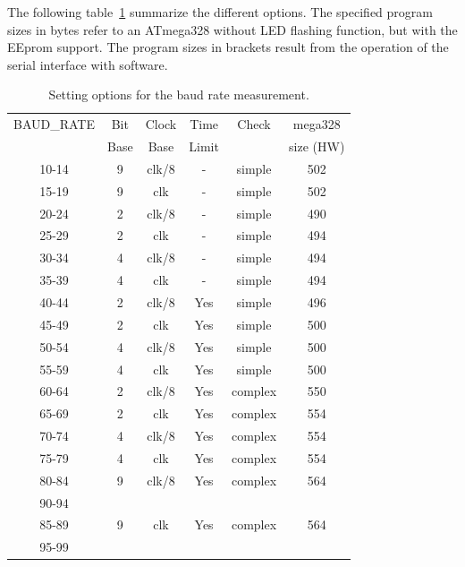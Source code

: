 The following table~\ref{tab:AutoBaudControl} summarize the different options.
The specified program sizes in bytes refer to an ATmega328 without LED flashing function,
but with the EEprom support.
The program sizes in brackets result from the operation of the serial interface with software.

\begin{table}[H]
  \begin{center}
    \begin{tabular}{| c | c | c | c | c | c |}
    \hline
    BAUD\_RATE  & Bit   & Clock  & Time  & Check & mega328\\
		& Base  & Base   & Limit &       & size (HW) \\
    \hline
    \hline
	    10-14      &  9     & clk/8 &   -    & simple  & 502  \\
    \hline
	    15-19      &  9     &  clk  &   -    & simple  & 502  \\
    \hline
	    20-24      &  2     & clk/8 &   -    & simple  & 490  \\
    \hline
	    25-29      &  2     &  clk  &   -    & simple  & 494  \\
    \hline
	    30-34      &  4     & clk/8 &   -    & simple  & 494  \\
    \hline
	    35-39      &  4     &  clk  &   -    & simple  & 494  \\
    \hline
	    40-44      &  2     & clk/8 &   Yes  & simple  & 496  \\
    \hline
	    45-49      &  2     &  clk  &   Yes  & simple  & 500  \\
    \hline
	    50-54      &  4     & clk/8 &   Yes  & simple  & 500  \\
    \hline
	    55-59      &  4     &  clk  &   Yes  & simple  & 500  \\
    \hline
    \hline
	    60-64      &  2     &  clk/8 &  Yes  & complex & 550  \\
    \hline
	    65-69      &  2     &  clk   &  Yes  & complex & 554  \\
    \hline
	    70-74      &  4     &  clk/8 &  Yes  & complex & 554  \\
    \hline
	    75-79      &  4     &  clk   &  Yes  & complex & 554  \\
    \hline
	    80-84      &  9     &  clk/8 &  Yes  & complex & 564  \\
	    90-94      &        &        &       &         &      \\
    \hline
	    85-89      &  9     &  clk   &  Yes  & complex & 564  \\
	    95-99      &        &        &       &         &     \\

    \hline
    \end{tabular}
  \end{center}
  \caption{Setting options for the baud rate measurement.}
  \label{tab:AutoBaudControl}
\end{table}


